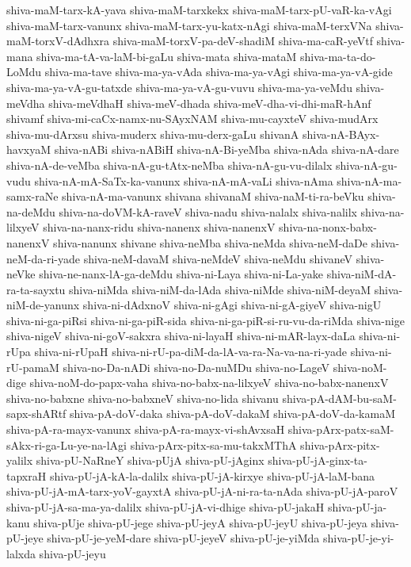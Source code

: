 {shiva-maM-tarx-kA-yava
shiva-maM-tarxkekx
shiva-maM-tarx-pU-vaR-ka-vAgi
shiva-maM-tarx-vanunx
shiva-maM-tarx-yu-katx-nAgi
shiva-maM-terxVNa
shiva-maM-torxV-dAdhxra
shiva-maM-torxV-pa-deV-shadiM
shiva-ma-caR-yeVtf
shiva-mana
shiva-ma-tA-va-laM-bi-gaLu
shiva-mata
shiva-mataM
shiva-ma-ta-do-LoMdu
shiva-ma-tave
shiva-ma-ya-vAda
shiva-ma-ya-vAgi
shiva-ma-ya-vA-gide
shiva-ma-ya-vA-gu-tatxde
shiva-ma-ya-vA-gu-vuvu
shiva-ma-ya-veMdu
shiva-meVdha
shiva-meVdhaH
shiva-meV-dhada
shiva-meV-dha-vi-dhi-maR-hAnf
shivamf
shiva-mi-caCx-namx-nu-SAyxNAM
shiva-mu-cayxteV
shiva-mudArx
shiva-mu-dArxsu
shiva-muderx
shiva-mu-derx-gaLu
shivanA
shiva-nA-BAyx-havxyaM
shiva-nABi
shiva-nABiH
shiva-nA-Bi-yeMba
shiva-nAda
shiva-nA-dare
shiva-nA-de-veMba
shiva-nA-gu-tAtx-neMba
shiva-nA-gu-vu-dilalx
shiva-nA-gu-vudu
shiva-nA-mA-SaTx-ka-vanunx
shiva-nA-mA-vaLi
shiva-nAma
shiva-nA-ma-samx-raNe
shiva-nA-ma-vanunx
shivana
shivanaM
shiva-naM-ti-ra-beVku
shiva-na-deMdu
shiva-na-doVM-kA-raveV
shiva-nadu
shiva-nalalx
shiva-nalilx
shiva-na-lilxyeV
shiva-na-nanx-ridu
shiva-nanenx
shiva-nanenxV
shiva-na-nonx-babx-nanenxV
shiva-nanunx
shivane
shiva-neMba
shiva-neMda
shiva-neM-daDe
shiva-neM-da-ri-yade
shiva-neM-davaM
shiva-neMdeV
shiva-neMdu
shivaneV
shiva-neVke
shiva-ne-nanx-lA-ga-deMdu
shiva-ni-Laya
shiva-ni-La-yake
shiva-niM-dA-ra-ta-sayxtu
shiva-niMda
shiva-niM-da-lAda
shiva-niMde
shiva-niM-deyaM
shiva-niM-de-yanunx
shiva-ni-dAdxnoV
shiva-ni-gAgi
shiva-ni-gA-giyeV
shiva-nigU
shiva-ni-ga-piRsi
shiva-ni-ga-piR-sida
shiva-ni-ga-piR-si-ru-vu-da-riMda
shiva-nige
shiva-nigeV
shiva-ni-goV-sakxra
shiva-ni-layaH
shiva-ni-mAR-layx-daLa
shiva-ni-rUpa
shiva-ni-rUpaH
shiva-ni-rU-pa-diM-da-lA-va-ra-Na-va-na-ri-yade
shiva-ni-rU-pamaM
shiva-no-Da-nADi
shiva-no-Da-nuMDu
shiva-no-LageV
shiva-noM-dige
shiva-noM-do-papx-vaha
shiva-no-babx-na-lilxyeV
shiva-no-babx-nanenxV
shiva-no-babxne
shiva-no-babxneV
shiva-no-lida
shivanu
shiva-pA-dAM-bu-saM-sapx-shARtf
shiva-pA-doV-daka
shiva-pA-doV-dakaM
shiva-pA-doV-da-kamaM
shiva-pA-ra-mayx-vanunx
shiva-pA-ra-mayx-vi-shAvxsaH
shiva-pArx-patx-saM-sAkx-ri-ga-Lu-ye-na-lAgi
shiva-pArx-pitx-sa-mu-takxMThA
shiva-pArx-pitx-yalilx
shiva-pU-NaRneY
shiva-pUjA
shiva-pU-jAginx
shiva-pU-jA-ginx-ta-tapxraH
shiva-pU-jA-kA-la-dalilx
shiva-pU-jA-kirxye
shiva-pU-jA-laM-bana
shiva-pU-jA-mA-tarx-yoV-gayxtA
shiva-pU-jA-ni-ra-ta-nAda
shiva-pU-jA-paroV
shiva-pU-jA-sa-ma-ya-dalilx
shiva-pU-jA-vi-dhige
shiva-pU-jakaH
shiva-pU-ja-kanu
shiva-pUje
shiva-pU-jege
shiva-pU-jeyA
shiva-pU-jeyU
shiva-pU-jeya
shiva-pU-jeye
shiva-pU-je-yeM-dare
shiva-pU-jeyeV
shiva-pU-je-yiMda
shiva-pU-je-yi-lalxda
shiva-pU-jeyu
}
